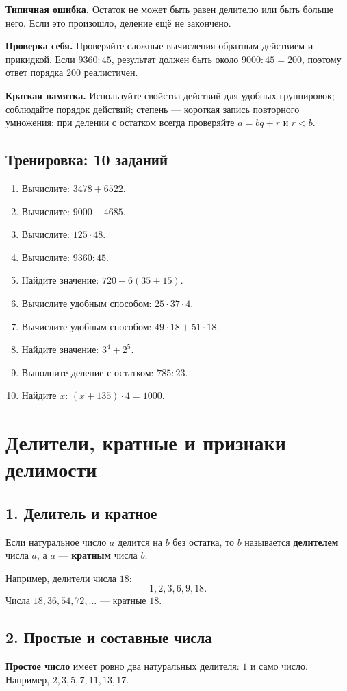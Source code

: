 \documentclass[12pt,a4paper]{article}
\newcommand{\term}[1]{\textbf{\textcolor{graphite}{#1}}}
\newcommand{\mistake}[1]{%
  \par\smallskip
  {\color{accent}\textbf{Типичная ошибка.}} #1\par\smallskip
}
\newcommand{\selfcheck}[1]{%
  \par\smallskip
  {\color{accent}\textbf{Проверка себя.}} #1\par\smallskip
}
\newcommand{\memo}[1]{%
  \par\smallskip
  \begingroup
  \setlength{\fboxsep}{7pt}%
  \colorbox{accentlight}{\parbox{0.94\textwidth}{\textbf{Краткая памятка.} #1}}%
  \endgroup
  \par\smallskip
}
\newcommand{\trainingtitle}{\subsection*{Тренировка: 10 заданий}}
\begin{document}
\mistake{Остаток не может быть равен делителю или быть больше него. Если это произошло, деление ещё не закончено.}

\selfcheck{Проверяйте сложные вычисления обратным действием и прикидкой. Если $9360:45$, результат должен быть около $9000:45=200$, поэтому ответ порядка $200$ реалистичен.}

\memo{Используйте свойства действий для удобных группировок; соблюдайте порядок действий; степень --- короткая запись повторного умножения; при делении с остатком всегда проверяйте $a=bq+r$ и $r<b$.}

\trainingtitle
\begin{enumerate}
  \item Вычислите: $3478+6522$.
  \item Вычислите: $9000-4685$.
  \item Вычислите: $125\cdot48$.
  \item Вычислите: $9360:45$.
  \item Найдите значение: $720-6(35+15)$.
  \item Вычислите удобным способом: $25\cdot37\cdot4$.
  \item Вычислите удобным способом: $49\cdot18+51\cdot18$.
  \item Найдите значение: $3^4+2^5$.
  \item Выполните деление с остатком: $785:23$.
  \item Найдите $x$: $(x+135)\cdot4=1000$.
\end{enumerate}

\newpage

\section{Делители, кратные и признаки делимости}

\subsection*{1. Делитель и кратное}
Если натуральное число $a$ делится на $b$ без остатка, то $b$ называется \term{делителем} числа $a$, а $a$ --- \term{кратным} числа $b$.

Например, делители числа $18$:
\[
1,2,3,6,9,18.
\]
Числа $18,36,54,72,\ldots$ --- кратные $18$.

\subsection*{2. Простые и составные числа}
\term{Простое число} имеет ровно два натуральных делителя: $1$ и само число. Например, $2,3,5,7,11,13,17$.
\end{document}
